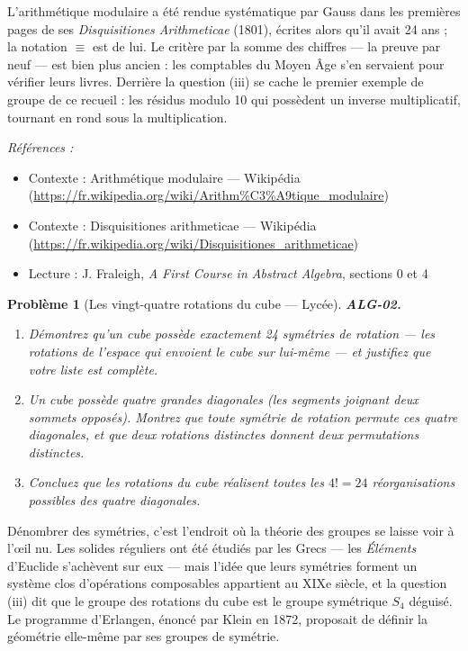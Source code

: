 \documentclass[11pt]{article}
\newtheorem{problem}{Problème}
\newenvironment{refs}{\par\small\noindent\emph{Références :}\begin{itemize}\setlength\itemsep{0pt}}{\end{itemize}\normalsize}
\begin{document}
\noindent L'arithmétique modulaire a été rendue systématique par Gauss dans les premières pages de ses
\textit{Disquisitiones Arithmeticae} (1801), écrites alors qu'il avait 24 ans ; la notation $\equiv$ est de lui. Le
critère par la somme des chiffres --- la \og{} preuve par neuf \fg{} --- est bien plus ancien : les comptables du Moyen Âge
s'en servaient pour vérifier leurs livres. Derrière la question (iii) se cache le premier exemple de groupe de ce
recueil : les résidus modulo 10 qui possèdent un inverse multiplicatif, tournant en rond sous la multiplication.

\begin{refs}
\item Contexte : Arithmétique modulaire --- Wikipédia (\url{https://fr.wikipedia.org/wiki/Arithm%C3%A9tique_modulaire})
\item Contexte : Disquisitiones arithmeticae --- Wikipédia (\url{https://fr.wikipedia.org/wiki/Disquisitiones_arithmeticae})
\item Lecture : J. Fraleigh, \textit{A First Course in Abstract Algebra}, sections 0 et 4
\end{refs}

\bigskip

\begin{problem}[{Les vingt-quatre rotations du cube --- Lycée}]
\textbf{ALG-02.} \begin{enumerate}
\item[(i)] Démontrez qu'un cube possède exactement 24 symétries de rotation
--- les rotations de l'espace qui envoient le cube sur lui-même --- et justifiez que votre liste est complète.
\item[(ii)] Un cube possède quatre grandes diagonales (les segments joignant deux sommets opposés). Montrez que toute
symétrie de rotation permute ces quatre diagonales, et que deux rotations distinctes donnent deux permutations
distinctes.
\item[(iii)] Concluez que les rotations du cube réalisent \textit{toutes} les
$4! = 24$ réorganisations possibles des quatre diagonales.
\end{enumerate}

\end{problem}

\noindent Dénombrer des symétries, c'est l'endroit où la théorie des groupes se laisse voir à l'\oe{}il nu.
Les solides réguliers ont été étudiés par les Grecs --- les \textit{Éléments} d'Euclide s'achèvent sur eux --- mais
l'idée que leurs symétries forment un système clos d'opérations composables appartient au XIXe siècle,
et la question (iii) dit que le groupe des rotations du cube \og{} est \fg{} le groupe symétrique $S_4$ déguisé.
Le programme d'Erlangen, énoncé par Klein en 1872, proposait de définir la géométrie elle-même par ses groupes de symétrie.
\end{document}

